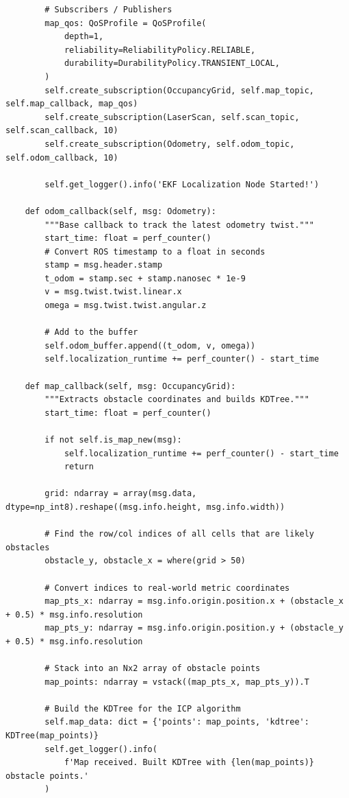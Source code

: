 \begin{verbatim}
        # Subscribers / Publishers
        map_qos: QoSProfile = QoSProfile(
            depth=1,
            reliability=ReliabilityPolicy.RELIABLE,
            durability=DurabilityPolicy.TRANSIENT_LOCAL,
        )
        self.create_subscription(OccupancyGrid, self.map_topic, self.map_callback, map_qos)
        self.create_subscription(LaserScan, self.scan_topic, self.scan_callback, 10)
        self.create_subscription(Odometry, self.odom_topic, self.odom_callback, 10)

        self.get_logger().info('EKF Localization Node Started!')

    def odom_callback(self, msg: Odometry):
        """Base callback to track the latest odometry twist."""
        start_time: float = perf_counter()
        # Convert ROS timestamp to a float in seconds
        stamp = msg.header.stamp
        t_odom = stamp.sec + stamp.nanosec * 1e-9
        v = msg.twist.twist.linear.x
        omega = msg.twist.twist.angular.z

        # Add to the buffer
        self.odom_buffer.append((t_odom, v, omega))
        self.localization_runtime += perf_counter() - start_time

    def map_callback(self, msg: OccupancyGrid):
        """Extracts obstacle coordinates and builds KDTree."""
        start_time: float = perf_counter()

        if not self.is_map_new(msg):
            self.localization_runtime += perf_counter() - start_time
            return

        grid: ndarray = array(msg.data, dtype=np_int8).reshape((msg.info.height, msg.info.width))

        # Find the row/col indices of all cells that are likely obstacles
        obstacle_y, obstacle_x = where(grid > 50)

        # Convert indices to real-world metric coordinates
        map_pts_x: ndarray = msg.info.origin.position.x + (obstacle_x + 0.5) * msg.info.resolution
        map_pts_y: ndarray = msg.info.origin.position.y + (obstacle_y + 0.5) * msg.info.resolution

        # Stack into an Nx2 array of obstacle points
        map_points: ndarray = vstack((map_pts_x, map_pts_y)).T

        # Build the KDTree for the ICP algorithm
        self.map_data: dict = {'points': map_points, 'kdtree': KDTree(map_points)}
        self.get_logger().info(
            f'Map received. Built KDTree with {len(map_points)} obstacle points.'
        )


\end{verbatim}
